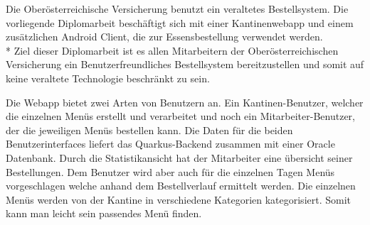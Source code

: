 Die Oberösterreichische Versicherung benutzt ein veraltetes Bestellsystem.
Die vorliegende Diplomarbeit beschäftigt sich mit einer Kantinenwebapp und einem zusätzlichen Android Client, die zur Essensbestellung
verwendet werden. 
\\*
Ziel dieser Diplomarbeit ist es allen Mitarbeitern der Oberösterreichischen Versicherung ein Benutzerfreundliches Bestellsystem
bereitzustellen und somit auf keine veraltete Technologie beschränkt zu sein. 

Die Webapp bietet zwei Arten von Benutzern an.
Ein Kantinen-Benutzer, welcher die einzelnen Menüs erstellt und verarbeitet
und noch ein Mitarbeiter-Benutzer, der die jeweiligen Menüs bestellen kann.
Die Daten für die beiden Benutzerinterfaces liefert das Quarkus-Backend zusammen mit einer Oracle Datenbank.
 Durch die Statistikansicht hat der Mitarbeiter eine
übersicht seiner Bestellungen. Dem Benutzer wird aber auch für die einzelnen Tagen Menüs vorgeschlagen
welche anhand dem Bestellverlauf ermittelt werden. Die einzelnen Menüs werden von der Kantine in verschiedene Kategorien kategorisiert.
Somit kann man leicht sein passendes Menü finden. 